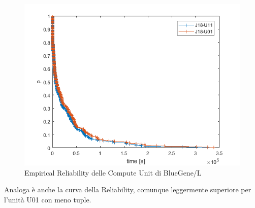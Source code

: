 		\begin{figure}[H]
			\centering
			\includegraphics[scale=0.7]{./immagine/categorieBGrel.png}
			\caption{Empirical Reliability delle Compute Unit di BlueGene/L}
			\label{fig:ffda-cBGrel}
		\end{figure}
	
		Analoga è anche la curva della Reliability, comunque leggermente superiore per l'unità U01 con meno tuple.
		
